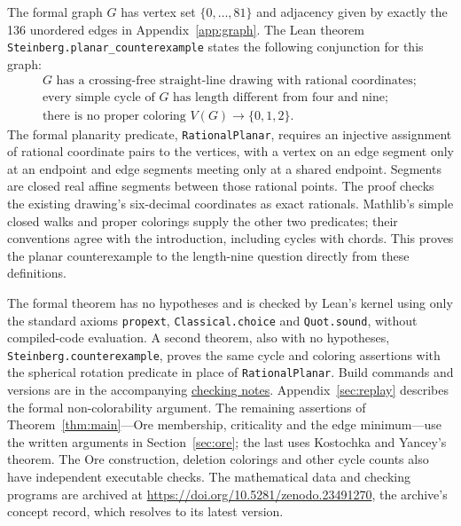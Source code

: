 \documentclass[11pt]{article}
\begin{document}
The formal graph $G$ has vertex set $\{0,\ldots,81\}$ and adjacency given
by exactly the 136 unordered edges in Appendix~\ref{app:graph}.
The Lean theorem \texttt{Steinberg.planar\_counterexample} states the
following conjunction for this graph:
\[
\begin{gathered}
G\text{ has a crossing-free straight-line drawing with rational coordinates};\\
\text{every simple cycle of }G\text{ has length different from four and nine};\\
\text{there is no proper coloring }V(G)\longrightarrow\{0,1,2\}.
\end{gathered}
\]
The formal planarity predicate, \texttt{RationalPlanar}, requires an
injective assignment of rational coordinate pairs to the vertices, with a
vertex on an edge segment only at an endpoint and edge segments meeting
only at a shared endpoint. Segments are closed real affine segments
between those rational points. The proof checks the existing drawing's
six-decimal coordinates as exact rationals. Mathlib's simple closed walks
and proper colorings supply the other two predicates; their conventions
agree with the introduction, including cycles with chords. This proves
the planar counterexample to the length-nine question directly from
these definitions.

The formal theorem has no hypotheses and is checked by Lean's kernel
using only the standard axioms \texttt{propext}, \texttt{Classical.choice}
and \texttt{Quot.sound}, without compiled-code evaluation. A second
theorem, also with no hypotheses,
\texttt{Steinberg.counterexample}, proves the same cycle and coloring
assertions with the spherical rotation predicate in place of
\texttt{RationalPlanar}. Build commands and versions are in the accompanying
\href{https://raw.githubusercontent.com/6/clank-lab/main/results/steinberg-c4-c9/checks/README.md}{checking notes}.
Appendix~\ref{sec:replay} describes the formal non-colorability argument.
The remaining assertions of Theorem~\ref{thm:main}---Ore membership,
criticality and the edge minimum---use the written arguments in
Section~\ref{sec:ore}; the last uses Kostochka and Yancey's theorem.
The Ore construction, deletion colorings and other cycle counts also
have independent executable checks. The mathematical data and checking
programs are archived at \url{https://doi.org/10.5281/zenodo.23491270},
the archive's concept record, which resolves to its latest version.
\end{document}
